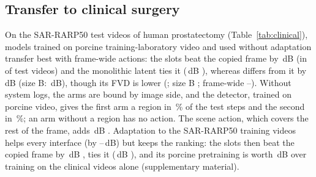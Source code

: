\subsection{Transfer to clinical surgery}\label{sec:clinical}
On the SAR-RARP50 test videos of human prostatectomy (Table~\ref{tab:clinical}), models trained on porcine training-laboratory video and used without adaptation transfer best with frame-wide actions: the slots beat the copied frame by \,dB  (in  of  test videos) and the monolithic latent ties it (\,dB ), whereas \method{} differs from it by \,dB  (size B: \,dB), though its FVD is lower (; size B ; frame-wide --). Without system logs, the arms are bound by image side, and the detector, trained on porcine video, gives the first arm a region in \,\% of the test steps and the second in \,\%; an arm without a region has no action. The scene action, which covers the rest of the frame, adds \,dB . Adaptation to the SAR-RARP50 training videos helps every interface (by --\,dB) but keeps the ranking: the slots then beat the copied frame by \,dB , \method{} ties it (\,dB ), and its porcine pretraining is worth \,dB  over training on the clinical videos alone (supplementary material).
